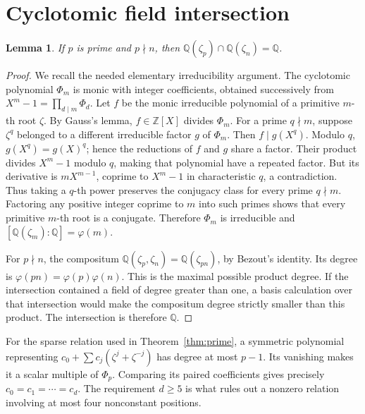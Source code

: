 \documentclass[11pt]{article}
\numberwithin{equation}{section}
\newtheorem{lemma}[theorem]{Lemma}
\theoremstyle{definition}
\newcommand{\Q}{\mathbb Q}
\newcommand{\Z}{\mathbb Z}
\begin{document}

\appendix

\section{Cyclotomic field intersection}
\begin{lemma}\label{lem:cyclotomic}
If \(p\) is prime and \(p\nmid n\), then
\(\Q(\zeta_p)\cap\Q(\zeta_n)=\Q\).
\end{lemma}
\begin{proof}
We recall the needed elementary irreducibility argument.
The cyclotomic polynomial \(\Phi_m\) is monic with integer
coefficients, obtained successively from \(X^m-1=\prod_{d\mid m}\Phi_d\).
Let \(f\) be the monic irreducible polynomial of a primitive \(m\)-th
root \(\zeta\). By Gauss's lemma, \(f\in\Z[X]\) divides \(\Phi_m\).
For a prime \(q\nmid m\), suppose \(\zeta^q\) belonged to a different
irreducible factor \(g\) of \(\Phi_m\). Then \(f\mid g(X^q)\).
Modulo \(q\), \(g(X^q)=g(X)^q\); hence the reductions of \(f\)
and \(g\) share a factor. Their product divides \(X^m-1\) modulo
\(q\), making that polynomial have a repeated factor.
But its derivative is \(mX^{m-1}\), coprime to \(X^m-1\)
in characteristic \(q\), a contradiction.
Thus taking a \(q\)-th power preserves the conjugacy class for
every prime \(q\nmid m\). Factoring any positive integer coprime
to \(m\) into such primes shows that every primitive \(m\)-th
root is a conjugate. Therefore \(\Phi_m\) is irreducible and
\([\Q(\zeta_m):\Q]=\varphi(m)\).

For \(p\nmid n\), the compositum
\(\Q(\zeta_p,\zeta_n)=\Q(\zeta_{pn})\), by Bezout's identity.
Its degree is
\(\varphi(pn)=\varphi(p)\varphi(n)\).
This is the maximal possible product degree. If the intersection
contained a field of degree greater than one, a basis calculation
over that intersection would make the compositum degree strictly
smaller than this product. The intersection is therefore \(\Q\).
\end{proof}

For the sparse relation used in Theorem~\ref{thm:prime}, a symmetric
polynomial representing \(c_0+\sum c_j(\zeta^j+\zeta^{-j})\) has
degree at most \(p-1\). Its vanishing makes it a scalar multiple
of \(\Phi_p\). Comparing its paired coefficients gives precisely
\(c_0=c_1=\cdots=c_d\). The requirement \(d\ge5\) is what rules
out a nonzero relation involving at most four nonconstant positions.
\end{document}
